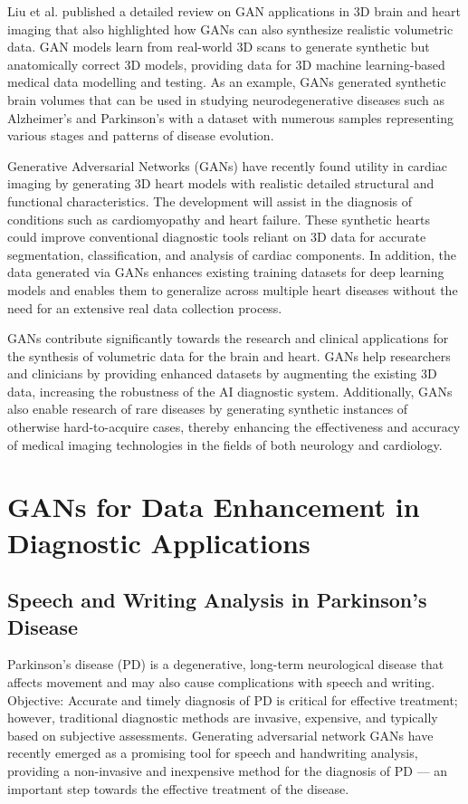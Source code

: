 \documentclass[12pt]{article}
\begin{document}
Liu et al. \cite{Liu2024} published a detailed review on GAN applications in 3D brain and heart imaging that also highlighted how GANs can also synthesize realistic volumetric data. GAN models learn from real-world 3D scans to generate synthetic but anatomically correct 3D models, providing data for 3D machine learning-based medical data modelling and testing. As an example, GANs generated synthetic brain volumes that can be used in studying neurodegenerative diseases such as Alzheimer's and Parkinson's with a dataset with numerous samples representing various stages and patterns of disease evolution.

Generative Adversarial Networks (GANs) have recently found utility in cardiac imaging by generating 3D heart models with realistic detailed structural and functional characteristics. The development will assist in the diagnosis of conditions such as cardiomyopathy and heart failure. These synthetic hearts could improve conventional diagnostic tools reliant on 3D data for accurate segmentation, classification, and analysis of cardiac components. In addition, the data generated via GANs enhances existing training datasets for deep learning models and enables them to generalize across multiple heart diseases without the need for an extensive real data collection process.

GANs contribute significantly towards the research and clinical applications for the synthesis of volumetric data for the brain and heart. GANs help researchers and clinicians by providing enhanced datasets by augmenting the existing 3D data, increasing the robustness of the AI diagnostic system. Additionally, GANs also enable research of rare diseases by generating synthetic instances of otherwise hard-to-acquire cases, thereby enhancing the effectiveness and accuracy of medical imaging technologies in the fields of both neurology and cardiology.

\section{GANs for Data Enhancement in Diagnostic Applications}
\subsection{Speech and Writing Analysis in Parkinson’s Disease}
Parkinson's disease (PD) is a degenerative, long-term neurological disease that affects movement and may also cause complications with speech and writing. Objective: Accurate and timely diagnosis of PD is critical for effective treatment; however, traditional diagnostic methods are invasive, expensive, and typically based on subjective assessments. Generating adversarial network GANs have recently emerged as a promising tool for speech and handwriting analysis, providing a non-invasive and inexpensive method for the diagnosis of PD — an important step towards the effective treatment of the disease.
\end{document}
